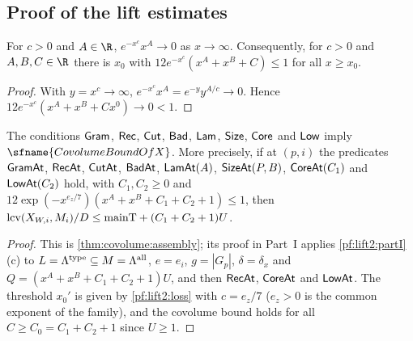 \subsection{Proof of the lift estimates}\label{sec:pf:lift2:main}

\begin{lemma}\label{pf:lift2:loss}
For $c>0$ and $A\in\R$, $e^{-x^c}x^A\to0$ as $x\to\infty$. Consequently, for $c>0$ and $A,B,C\in\R$ there is $x_0$
with $12e^{-x^c}(x^A+x^B+C)\le1$ for all $x\ge x_0$.
\end{lemma}

\begin{proof}
With $y=x^c\to\infty$, $e^{-x^c}x^A=e^{-y}y^{A/c}\to0$. Hence $12e^{-x^c}(x^A+x^B+Cx^0)\to0<1$.
\end{proof}

\begin{theorem}\label{pf:lift2:assembly}
The conditions $\mathsf{Gram}$, $\mathsf{Rec}$, $\mathsf{Cut}$, $\mathsf{Bad}$, $\mathsf{Lam}$,
$\mathsf{Size}$, $\mathsf{Core}$ and $\mathsf{Low}$ imply $\sfname{CovolumeBoundOfX}$. More precisely, if at
$(p,i)$ the predicates $\mathsf{GramAt}$, $\mathsf{RecAt}$, $\mathsf{CutAt}$, $\mathsf{BadAt}$,
$\mathsf{LamAt}(A)$, $\mathsf{SizeAt}(P,B)$, $\mathsf{CoreAt}(C_1)$ and $\mathsf{LowAt}(C_2)$ hold, with
$C_1,C_2\ge0$ and $12\exp(-x^{e_z/7})(x^A+x^B+C_1+C_2+1)\le1$, then
$\operatorname{lcv}(X_{W,i},M_i)/D\le\mathrm{mainT}+(C_1+C_2+1)U$.
\end{theorem}

\begin{proof}
This is \cref{thm:covolume:assembly}; its proof in Part~I applies \cref{pf:lift2:partI}(c) to
$L=\Lambda^{\mathrm{type}}\subseteq M=\Lambda^{\mathrm{all}}$, $e=e_i$, $g=|G_p|$, $\delta=\delta_x$ and
$Q=(x^A+x^B+C_1+C_2+1)U$, and then $\mathsf{RecAt}$, $\mathsf{CoreAt}$ and $\mathsf{LowAt}$. The threshold $x_0'$ is
given by \cref{pf:lift2:loss} with $c=e_z/7$ ($e_z>0$ is the common exponent of the family), and the
covolume bound holds for all $C\ge C_0=C_1+C_2+1$ since $U\ge1$.
\end{proof}

